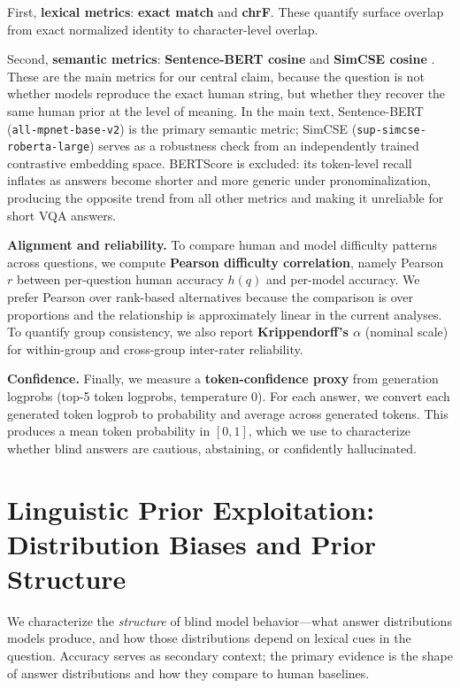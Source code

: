 \documentclass[letterpaper]{article}
\begin{document}
First, \textbf{lexical metrics}: \textbf{exact match} and \textbf{chrF}.
These quantify surface overlap from exact normalized identity to character-level overlap.

Second, \textbf{semantic metrics}: \textbf{Sentence-BERT cosine}
\citep{wang2020minilm} and \textbf{SimCSE cosine} \citep{gao2021simcse}.
These are the main metrics for our central claim, because the question is not
whether models reproduce the exact human string, but whether they recover the
same human prior at the level of meaning. In the main text, Sentence-BERT
(\texttt{all-mpnet-base-v2}) is the primary semantic metric; SimCSE
(\texttt{sup-simcse-roberta-large}) serves as a robustness check from an
independently trained contrastive embedding space. BERTScore is excluded: its
token-level recall inflates as answers become shorter and more generic under
pronominalization, producing the opposite trend from all other metrics and
making it unreliable for short VQA answers.

\textbf{Alignment and reliability.}
To compare human and model difficulty patterns across questions, we compute
\textbf{Pearson difficulty correlation}, namely Pearson $r$ between per-question
human accuracy $h(q)$ and per-model accuracy. We prefer Pearson over rank-based
alternatives because the comparison is over proportions and the relationship is
approximately linear in the current analyses. To quantify group consistency, we
also report \textbf{Krippendorff's $\alpha$} (nominal scale) for within-group
and cross-group inter-rater reliability.

\textbf{Confidence.}
Finally, we measure a \textbf{token-confidence proxy} from generation
logprobs (top-5 token logprobs, temperature 0). For each answer, we convert
each generated token logprob to probability and average across generated
tokens. This produces a mean token probability in $[0,1]$, which we use to
characterize whether blind answers are cautious, abstaining, or confidently
hallucinated.

\section{Linguistic Prior Exploitation: Distribution Biases and Prior Structure}
\label{sec:prior}

We characterize the \emph{structure} of blind model behavior---what answer
distributions models produce, and how those distributions depend on lexical
cues in the question. Accuracy serves as secondary context; the primary
evidence is the shape of answer distributions and how they compare to human
baselines.
\end{document}
